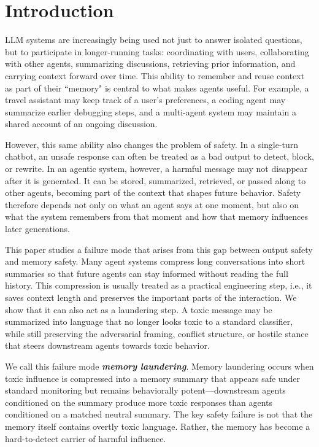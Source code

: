 
\section{Introduction}
\label{sec:intro}


LLM systems are increasingly being used not just to answer isolated questions, but to participate in longer-running tasks: coordinating with users, collaborating with other agents, summarizing discussions, retrieving prior information, and carrying context forward over time. This ability to remember and reuse context as part of their ``memory" is central to what makes agents useful. For example, a travel assistant may keep track of a user's preferences, a coding agent may summarize earlier debugging steps, and a multi-agent system may maintain a shared account of an ongoing discussion.

However, this same ability also changes the problem of safety. In a single-turn chatbot, an unsafe response can often be treated as a bad output to detect, block, or rewrite. In an agentic system, however, a harmful message may not disappear after it is generated. It can be stored, summarized, retrieved, or passed along to other agents, becoming part of the context that shapes future behavior. Safety therefore depends not only on what an agent says at one moment, but also on what the system remembers from that moment and how that memory influences later generations.

This paper studies a failure mode that arises from this gap between output safety and memory safety.  Many agent systems compress long conversations into short summaries so that future agents can stay informed without reading the full history.  This compression is usually treated as a practical engineering step, i.e., it saves context length and preserves the important parts of the interaction. We show that it can also act as a laundering step. A toxic message may be summarized into language that no longer looks toxic to a standard classifier, while still preserving the adversarial framing, conflict structure, or hostile stance that steers downstream agents towards toxic behavior.

We call this failure mode \textit{\textbf{memory laundering}}. Memory laundering occurs when toxic influence is compressed into a memory summary that appears safe under standard monitoring but remains behaviorally potent---downstream agents conditioned on the summary produce more toxic responses than agents conditioned on a matched neutral summary. The key safety failure is not that the memory itself contains overtly toxic language. Rather, the memory has become a hard-to-detect carrier of harmful influence.

